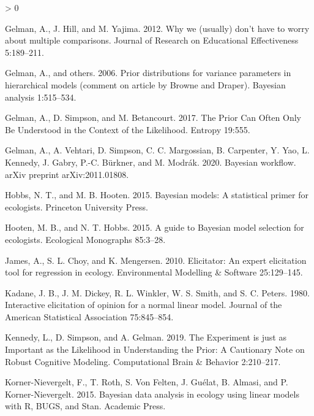 \documentclass[
  12pt,
]{article}
\newlength{\cslhangindent}
\newenvironment{CSLReferences}[2] %
 {%
  \setlength{\parindent}{0pt}
  \ifodd #1 \everypar{\setlength{\hangindent}{\cslhangindent}}\ignorespaces\fi
  \ifnum #2 > 0
  \setlength{\parskip}{#2\baselineskip}
  \fi
 }%
 {}
\begin{document}
\begin{CSLReferences}{1}{0}
\leavevmode\hypertarget{ref-gelman_why_2012}{}%
Gelman, A., J. Hill, and M. Yajima. 2012. Why we (usually) don't have to
worry about multiple comparisons. Journal of Research on Educational
Effectiveness 5:189--211.

\leavevmode\hypertarget{ref-gelman_prior_2006}{}%
Gelman, A., and others. 2006. Prior distributions for variance
parameters in hierarchical models (comment on article by {Browne} and
{Draper}). Bayesian analysis 1:515--534.

\leavevmode\hypertarget{ref-gelman_prior_2017}{}%
Gelman, A., D. Simpson, and M. Betancourt. 2017. The {Prior} {Can}
{Often} {Only} {Be} {Understood} in the {Context} of the {Likelihood}.
Entropy 19:555.

\leavevmode\hypertarget{ref-gelman_bayesian_2020}{}%
Gelman, A., A. Vehtari, D. Simpson, C. C. Margossian, B. Carpenter, Y.
Yao, L. Kennedy, J. Gabry, P.-C. Bürkner, and M. Modrák. 2020. Bayesian
workflow. arXiv preprint arXiv:2011.01808.

\leavevmode\hypertarget{ref-hobbs_bayesian_2015}{}%
Hobbs, N. T., and M. B. Hooten. 2015. Bayesian models: A statistical
primer for ecologists. Princeton University Press.

\leavevmode\hypertarget{ref-hooten_guide_2015}{}%
Hooten, M. B., and N. T. Hobbs. 2015. A guide to {Bayesian} model
selection for ecologists. Ecological Monographs 85:3--28.

\leavevmode\hypertarget{ref-james_elicitator_2010}{}%
James, A., S. L. Choy, and K. Mengersen. 2010. Elicitator: An expert
elicitation tool for regression in ecology. Environmental Modelling \&
Software 25:129--145.

\leavevmode\hypertarget{ref-kadane_interactive_1980}{}%
Kadane, J. B., J. M. Dickey, R. L. Winkler, W. S. Smith, and S. C.
Peters. 1980. Interactive elicitation of opinion for a normal linear
model. Journal of the American Statistical Association 75:845--854.

\leavevmode\hypertarget{ref-kennedy_experiment_2019}{}%
Kennedy, L., D. Simpson, and A. Gelman. 2019. The {Experiment} is just
as {Important} as the {Likelihood} in {Understanding} the {Prior}: A
{Cautionary} {Note} on {Robust} {Cognitive} {Modeling}. Computational
Brain \& Behavior 2:210--217.

\leavevmode\hypertarget{ref-korner-nievergelt_bayesian_2015}{}%
Korner-Nievergelt, F., T. Roth, S. Von Felten, J. Guélat, B. Almasi, and
P. Korner-Nievergelt. 2015. Bayesian data analysis in ecology using
linear models with {R}, {BUGS}, and {Stan}. Academic Press.


\end{CSLReferences}
\end{document}

